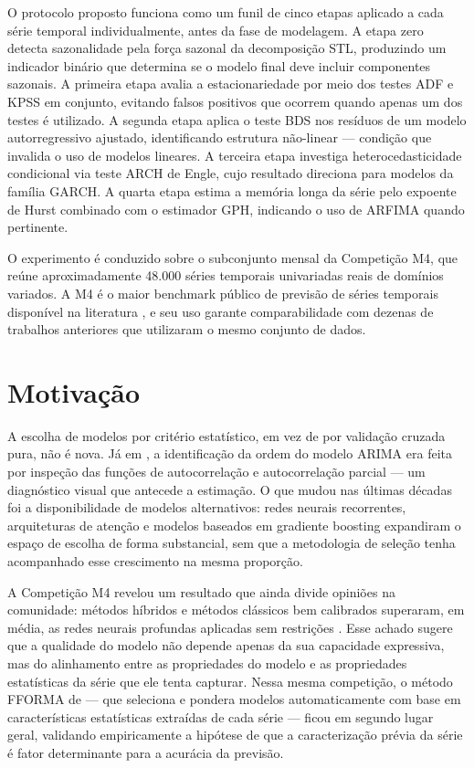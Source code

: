 \documentclass[
  12pt,
  openright,
  twoside,
  a4paper,
  english,
  brazil
]{abntex2}
\begin{document}
O protocolo proposto funciona como um funil de cinco etapas aplicado a cada série temporal individualmente, antes da fase de modelagem. A etapa zero detecta sazonalidade pela força sazonal da decomposição STL, produzindo um indicador binário que determina se o modelo final deve incluir componentes sazonais. A primeira etapa avalia a estacionariedade por meio dos testes ADF e KPSS em conjunto, evitando falsos positivos que ocorrem quando apenas um dos testes é utilizado. A segunda etapa aplica o teste BDS nos resíduos de um modelo autorregressivo ajustado, identificando estrutura não-linear — condição que invalida o uso de modelos lineares. A terceira etapa investiga heterocedasticidade condicional via teste ARCH de Engle, cujo resultado direciona para modelos da família GARCH. A quarta etapa estima a memória longa da série pelo expoente de Hurst combinado com o estimador GPH, indicando o uso de ARFIMA quando pertinente.

O experimento é conduzido sobre o subconjunto mensal da Competição M4, que reúne aproximadamente 48.000 séries temporais univariadas reais de domínios variados. A M4 é o maior benchmark público de previsão de séries temporais disponível na literatura \cite{makridakis2020m4}, e seu uso garante comparabilidade com dezenas de trabalhos anteriores que utilizaram o mesmo conjunto de dados.

\section{Motivação}
\label{sec:motivacao}

A escolha de modelos por critério estatístico, em vez de por validação cruzada pura, não é nova. Já em , a identificação da ordem do modelo ARIMA era feita por inspeção das funções de autocorrelação e autocorrelação parcial — um diagnóstico visual que antecede a estimação. O que mudou nas últimas décadas foi a disponibilidade de modelos alternativos: redes neurais recorrentes, arquiteturas de atenção e modelos baseados em gradiente boosting expandiram o espaço de escolha de forma substancial, sem que a metodologia de seleção tenha acompanhado esse crescimento na mesma proporção.

A Competição M4 revelou um resultado que ainda divide opiniões na comunidade: métodos híbridos e métodos clássicos bem calibrados superaram, em média, as redes neurais profundas aplicadas sem restrições \cite{makridakis2018m4results}. Esse achado sugere que a qualidade do modelo não depende apenas da sua capacidade expressiva, mas do alinhamento entre as propriedades do modelo e as propriedades estatísticas da série que ele tenta capturar. Nessa mesma competição, o método FFORMA de  — que seleciona e pondera modelos automaticamente com base em características estatísticas extraídas de cada série — ficou em segundo lugar geral, validando empiricamente a hipótese de que a caracterização prévia da série é fator determinante para a acurácia da previsão.
\end{document}
